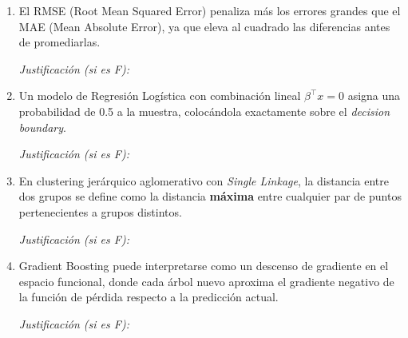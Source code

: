 \documentclass[11pt,a4paper]{article}
\begin{document}
\begin{enumerate}[label=\textbf{\arabic*.}, leftmargin=*, itemsep=18pt]
\vspace{0.5cm}
\noindent\textit{Justificaci\'on (si es F):} \underline{\hspace{12cm}}

\vspace{0.2cm}
\underline{\hspace{14cm}}

\item \underline{\hspace{1cm}} El RMSE (Root Mean Squared Error) penaliza m\'as los errores grandes que el MAE (Mean Absolute Error), ya que eleva al cuadrado las diferencias antes de promediarlas.

\vspace{0.5cm}
\noindent\textit{Justificaci\'on (si es F):} \underline{\hspace{12cm}}

\vspace{0.2cm}
\underline{\hspace{14cm}}

\item \underline{\hspace{1cm}} Un modelo de Regresi\'on Log\'istica con combinaci\'on lineal $\beta^\top x = 0$ asigna una probabilidad de 0.5 a la muestra, coloc\'andola exactamente sobre el \textit{decision boundary}.

\vspace{0.5cm}
\noindent\textit{Justificaci\'on (si es F):} \underline{\hspace{12cm}}

\vspace{0.2cm}
\underline{\hspace{14cm}}

\item \underline{\hspace{1cm}} En clustering jer\'arquico aglomerativo con \textit{Single Linkage}, la distancia entre dos grupos se define como la distancia \textbf{m\'axima} entre cualquier par de puntos pertenecientes a grupos distintos.

\vspace{0.5cm}
\noindent\textit{Justificaci\'on (si es F):} \underline{\hspace{12cm}}

\vspace{0.2cm}
\underline{\hspace{14cm}}

\item \underline{\hspace{1cm}} Gradient Boosting puede interpretarse como un descenso de gradiente en el espacio funcional, donde cada \'arbol nuevo aproxima el gradiente negativo de la funci\'on de p\'erdida respecto a la predicci\'on actual.

\vspace{0.5cm}
\noindent\textit{Justificaci\'on (si es F):} \underline{\hspace{12cm}}

\vspace{0.2cm}
\underline{\hspace{14cm}}

\end{enumerate}
\end{document}
